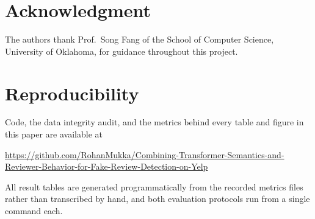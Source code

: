\documentclass[conference]{IEEEtran}
\begin{document}
\section*{Acknowledgment}

The authors thank Prof.\ Song Fang of the School of Computer Science,
University of Oklahoma, for guidance throughout this project.

\section*{Reproducibility}

Code, the data integrity audit, and the metrics behind every table and figure in
this paper are available at

\begin{center}
\begin{minipage}{0.95\columnwidth}
\footnotesize\sloppy
\url{https://github.com/RohanMukka/Combining-Transformer-Semantics-and-Reviewer-Behavior-for-Fake-Review-Detection-on-Yelp}
\end{minipage}
\end{center}

\noindent All result tables are generated programmatically from the recorded
metrics files rather than transcribed by hand, and both evaluation protocols
run from a single command each.



\end{document}
